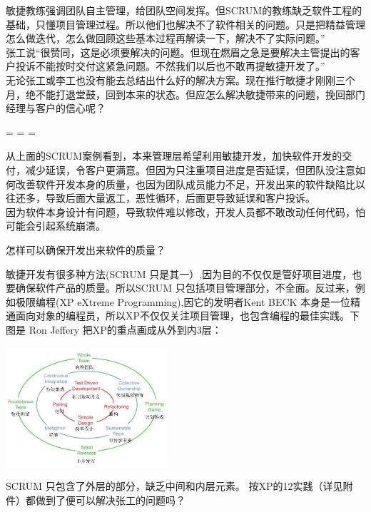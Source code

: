 敏捷教练强调团队自主管理，给团队空间发挥。但SCRUM的教练缺乏软件工程的基础，只懂项目管理过程。所以他们也解决不了软件相关的问题。只是把精益管理怎么做迭代，怎么做回顾这些基本过程再解读一下，解决不了实际问题。”\\

张工说“很赞同，这是必须要解决的问题。但现在燃眉之急是要解决主管提出的客户投诉不能按时交付这紧急问题。不然我们以后也不敢再提敏捷开发了。”\\

无论张工或李工也没有能去总结出什么好的解决方案。现在推行敏捷才刚刚三个月，绝不能打退堂鼓，回到本来的状态。但应怎么解决敏捷带来的问题，挽回部门经理与客户的信心呢？
\begin{description}
\tightlist
\item[]
= = =
\end{description}

从上面的SCRUM案例看到，本来管理层希望利用敏捷开发，加快软件开发的交付，减少延误，令客户更满意。但因为只注重项目进度是否延误，但团队没注意如何改善软件开发本身的质量，也因为团队成员能力不足，开发出来的软件缺陷比以往还多，导致后面大量返工，恶性循环，后面更导致延误和客户投诉。\\
因为软件本身设计有问题，导致软件难以修改，开发人员都不敢改动任何代码，怕可能会引起系统崩溃。

怎样可以确保开发出来软件的质量？

敏捷开发有很多种方法(SCRUM
只是其一）,因为目的不仅仅是管好项目进度，也要确保软件产品的质量。所以SCRUM
只包括项目管理部分，不全面。反过来，例如极限编程(XP eXtreme
Programming),因它的发明者Kent BECK
本身是一位精通面向对象的编程员，所以XP不仅仅关注项目管理，也包含编程的最佳实践。下图是
Ron Jeffery 把XP的重点画成从外到内3层：


\includegraphics[width=6cm]{cleanagile_f18.jpg}

SCRUM 只包含了外层的部分，缺乏中间和内层元素。
按XP的12实践（详见附件）都做到了便可以解决张工的问题吗？\\

